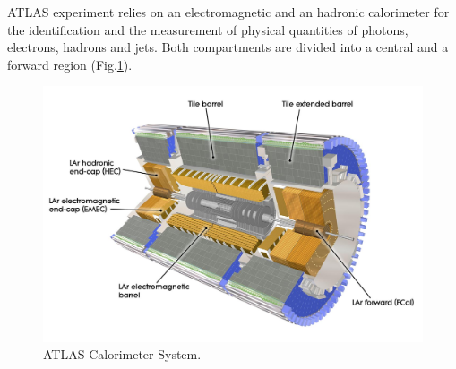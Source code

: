 \documentclass[a4paper,12pt]{article}
\begin{document}
ATLAS experiment  relies on an electromagnetic and an hadronic calorimeter for the identification and the measurement of physical quantities of photons, electrons, hadrons and jets. 
Both compartments are divided into a central and a forward region (Fig.\ref{fig:current_Cals}).

\begin{figure} [h]
	\includegraphics[width=\textwidth]{current_Cals}
	\caption{ATLAS Calorimeter System.}
	\label{fig:current_Cals}
\end{figure}
\end{document}
